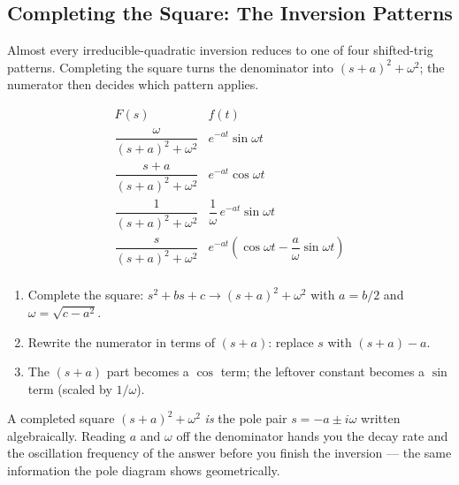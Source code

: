 \subsection{Completing the Square: The Inversion Patterns}

Almost every irreducible-quadratic inversion reduces to one of four shifted-trig
patterns. Completing the square turns the denominator into $(s+a)^2+\omega^2$; the
numerator then decides which pattern applies.

\begin{formulabox}
\renewcommand{\arraystretch}{1.8}
\[
\begin{array}{ll}
F(s) & f(t) \\ \hline
\dfrac{\omega}{(s+a)^2+\omega^2} & e^{-at}\sin\omega t \\
\dfrac{s+a}{(s+a)^2+\omega^2} & e^{-at}\cos\omega t \\
\dfrac{1}{(s+a)^2+\omega^2} & \dfrac{1}{\omega}\,e^{-at}\sin\omega t \\
\dfrac{s}{(s+a)^2+\omega^2} & e^{-at}\!\left(\cos\omega t - \dfrac{a}{\omega}\sin\omega t\right) \\
\end{array}
\]
\end{formulabox}

\begin{methodbox}
\begin{enumerate}
    \item Complete the square: $s^2+bs+c \to (s+a)^2+\omega^2$ with $a=b/2$ and
          $\omega = \sqrt{c - a^2}$.
    \item Rewrite the numerator in terms of $(s+a)$: replace $s$ with $(s+a)-a$.
    \item The $(s+a)$ part becomes a $\cos$ term; the leftover constant becomes a
          $\sin$ term (scaled by $1/\omega$).
\end{enumerate}
\end{methodbox}

\begin{conceptbox}
A completed square $(s+a)^2+\omega^2$ \emph{is} the pole pair
$s=-a\pm i\omega$ written algebraically. Reading $a$ and $\omega$ off the denominator
hands you the \textcolor{accentorange}{decay rate} and the
\textcolor{accentorange}{oscillation frequency} of the answer before you finish the
inversion --- the same information the pole diagram shows geometrically.
\end{conceptbox}

